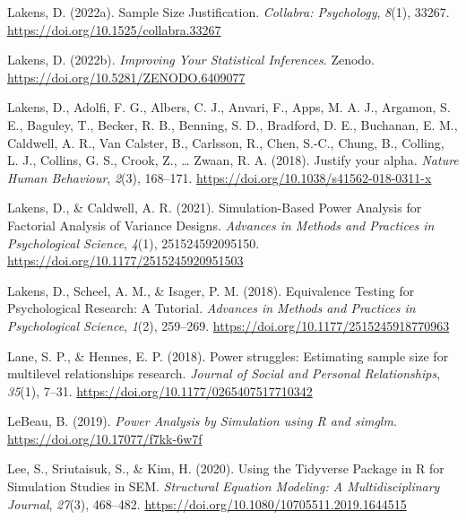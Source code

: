 \documentclass[
  man,
  floatsintext,
  longtable,
  a4paper,
  nolmodern,
  notxfonts,
  notimes,
  colorlinks=true,linkcolor=blue,citecolor=blue,urlcolor=blue]{apa7}
\newlength{\cslhangindent}
\newenvironment{CSLReferences}[2] %
 {\begin{list}{}{%
  \setlength{\itemindent}{0pt}
  \setlength{\leftmargin}{0pt}
  \setlength{\parsep}{0pt}
  \ifodd #1
   \setlength{\leftmargin}{\cslhangindent}
   \setlength{\itemindent}{-1\cslhangindent}
  \fi
  \setlength{\itemsep}{#2\baselineskip}}}
 {\end{list}}
\begin{document}
\begin{CSLReferences}{1}{0}
Lakens, D. (2022a). Sample {Size Justification}. \emph{Collabra:
Psychology}, \emph{8}(1), 33267.
\url{https://doi.org/10.1525/collabra.33267}

Lakens, D. (2022b). \emph{Improving {Your Statistical Inferences}}.
Zenodo. \url{https://doi.org/10.5281/ZENODO.6409077}

Lakens, D., Adolfi, F. G., Albers, C. J., Anvari, F., Apps, M. A. J.,
Argamon, S. E., Baguley, T., Becker, R. B., Benning, S. D., Bradford, D.
E., Buchanan, E. M., Caldwell, A. R., Van Calster, B., Carlsson, R.,
Chen, S.-C., Chung, B., Colling, L. J., Collins, G. S., Crook, Z.,
\ldots{} Zwaan, R. A. (2018). Justify your alpha. \emph{Nature Human
Behaviour}, \emph{2}(3), 168--171.
\url{https://doi.org/10.1038/s41562-018-0311-x}

Lakens, D., \& Caldwell, A. R. (2021). Simulation-{Based Power Analysis}
for {Factorial Analysis} of {Variance Designs}. \emph{Advances in
Methods and Practices in Psychological Science}, \emph{4}(1),
251524592095150. \url{https://doi.org/10.1177/2515245920951503}

Lakens, D., Scheel, A. M., \& Isager, P. M. (2018). Equivalence
{Testing} for {Psychological Research}: {A Tutorial}. \emph{Advances in
Methods and Practices in Psychological Science}, \emph{1}(2), 259--269.
\url{https://doi.org/10.1177/2515245918770963}

Lane, S. P., \& Hennes, E. P. (2018). Power struggles: {Estimating}
sample size for multilevel relationships research. \emph{Journal of
Social and Personal Relationships}, \emph{35}(1), 7--31.
\url{https://doi.org/10.1177/0265407517710342}

LeBeau, B. (2019). \emph{Power {Analysis} by {Simulation} using {R} and
simglm}. \url{https://doi.org/10.17077/f7kk-6w7f}

Lee, S., Sriutaisuk, S., \& Kim, H. (2020). Using the {Tidyverse
Package} in {R} for {Simulation Studies} in {SEM}. \emph{Structural
Equation Modeling: A Multidisciplinary Journal}, \emph{27}(3), 468--482.
\url{https://doi.org/10.1080/10705511.2019.1644515}


\end{CSLReferences}
\end{document}
